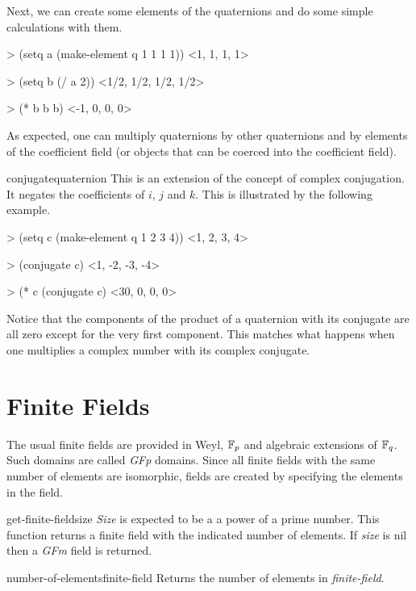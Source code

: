   Next, we can create some elements of the quaternions and do some
simple calculations with them.
\begin{code}
> (setq a (make-element q 1 1 1 1))
<1, 1, 1, 1>

> (setq b (/ a 2))
<1/2, 1/2, 1/2, 1/2>
  
> (* b b b)
<-1, 0, 0, 0>
\end{code}
  
\noindent
As expected, one can multiply quaternions by other quaternions and by
elements of the coefficient field (or objects that can be coerced into
the coefficient field).
  
\begin{functiondef}{conjugate}{quaternion}
This is an extension of the concept of complex conjugation.  It
negates the coefficients of $i$, $j$ and $k$. This is illustrated by
the following example.
\begin{code}
> (setq c (make-element q 1 2 3 4))
<1, 2, 3, 4>
  
> (conjugate c)
<1, -2, -3, -4>

> (* c (conjugate c)
<30, 0, 0, 0>
\end{code}
\end{functiondef}
  
Notice that the components of the product of a quaternion with its
conjugate are all zero except for the very first component. This
matches what happens when one multiplies a complex number with its
complex conjugate.
  


\section{Finite Fields}
\label{Finite:Fields:Sec}

The usual finite fields are provided in Weyl, ${\Bbb F}_p$ and algebraic
extensions of ${\Bbb F}_q$.  Such domains are called {\em GFp} domains.
Since all finite fields with the same number of elements are
isomorphic, fields are created by specifying the elements in the
field.

\begin{functiondef}{get-finite-field}{size}
{\em Size} is expected to be a a power of a prime number.  This
function returns a finite field with the indicated number of elements.
If {\em size} is {\sf nil} then a {\em GFm} field is returned. 
\end{functiondef}

\begin{functiondef}{number-of-elements}{finite-field}
Returns the number of elements in {\em finite-field}.
\end{functiondef}

